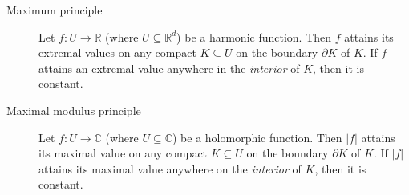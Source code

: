 \documentclass[12pt]{article}
\newcommand{\Reals}{\mathbb{R}}
\newcommand{\Complex}{\mathbb{C}}
\begin{document}
\begin{description}

\item[Maximum principle]
Let $f:U\to \Reals$ (where $U\subseteq \Reals^d$) be a harmonic function.  Then $f$ attains its extremal values on any compact $K\subseteq U$ on the boundary $\partial K$ of $K$.  If $f$ attains an extremal value anywhere in the \emph{interior} of $K$, then it is constant.


\item[Maximal modulus principle]
Let $f:U\to\Complex$ (where $U\subseteq \Complex$) be a holomorphic function.  Then $|f|$ attains its maximal value on any compact $K\subseteq U$ on the boundary $\partial K$ of $K$.  If $|f|$ attains its maximal value anywhere on the \emph{interior} of $K$, then it is constant.

\end{description}
\end{document}
